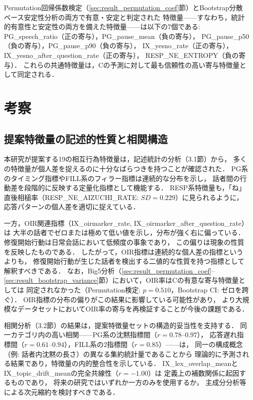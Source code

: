 \documentclass[dvipdfmx,11pt,a4paper]{bxjsarticle}
\begin{document}
Permutation回帰係数検定（\ref{sec:result_permutation_coef}節）とBootstrap分散ベース安定性分析の両方で有意・安定と判定された
特徴量——すなわち，統計的有意性と安定性の両方を備えた特徴量——は以下の7個である:
PG\_speech\_ratio（正の寄与），PG\_pause\_mean（負の寄与），
PG\_pause\_p50（負の寄与），PG\_pause\_p90（負の寄与），
IX\_yesno\_rate（正の寄与），IX\_yesno\_after\_question\_rate（正の寄与），
RESP\_NE\_ENTROPY（負の寄与）．
これらの共通特徴量は，Cの予測に対して最も信頼性の高い寄与特徴量として同定される．

\section{考察}

\subsection{提案特徴量の記述的性質と相関構造}

本研究が提案する19の相互行為特徴量は，記述統計の分析（3.1節）から，
多くの特徴量が個人差を捉えるのに十分なばらつきを持つことが確認された．
PG系のタイミング指標やFILL系のフィラー指標は連続的な分布を示し，
話者間の行動差を段階的に反映する定量化指標として機能する．
RESP系特徴量も，「ね」直後相槌率（RESP\_NE\_AIZUCHI\_RATE: $SD = 0.229$）に見られるように，
応答パターンの個人差を適切に捉えている．

一方，OIR関連指標（IX\_oirmarker\_rate, IX\_oirmarker\_after\_question\_rate）は
大半の話者でゼロまたは極めて低い値を示し，分布が強く右に偏っている．
修復開始行動は日常会話において低頻度の事象であり，
この偏りは現象の性質を反映したものである．
したがって，OIR指標は連続的な個人差の指標というよりも，
修復開始行動が生じた話者を検出する二値的な性質を持つ指標として解釈すべきである．
なお，Big5分析（\ref{sec:result_permutation_coef}--\ref{sec:result_bootstrap_variance}節）において，OIR率はCの有意な寄与特徴量としては
同定されなかった（Permutation検定: $p = 0.510$，Bootstrap CI: ゼロを跨ぐ）．
OIR指標の分布の偏りがこの結果に影響している可能性があり，
より大規模なデータセットにおいてOIR率の寄与を再検証することが今後の課題である．

相関分析（3.2節）の結果は，提案特徴量セットの構造的妥当性を支持する．
同一カテゴリ内の高い相関——PG系の沈黙指標間（$r = 0.78$--$0.97$），
応答遅れ指標間（$r = 0.61$--$0.94$），FILL系の2指標間（$r = 0.85$）——は，
同一の構成概念（例: 話者内沈黙の長さ）の異なる集約統計量であることから
理論的に予測される結果であり，特徴量の内的整合性を示している．
IX\_lex\_overlap\_meanとIX\_topic\_drift\_meanの完全共線性（$r = -1.00$）は
定義上の補数関係に起因するものであり，
将来の研究ではいずれか一方のみを使用するか，
主成分分析等による次元縮約を検討すべきである．
\end{document}
